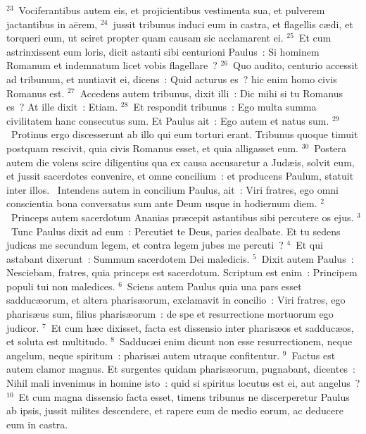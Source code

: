 ${}^{23}$~Vociferantibus autem eis, et projicientibus vestimenta sua, et pulverem jactantibus in a\"erem,
${}^{24}$~jussit tribunus induci eum in castra, et flagellis c\ae di, et torqueri eum, ut sciret propter quam causam sic acclamarent ei.
${}^{25}$~Et cum astrinxissent eum loris, dicit astanti sibi centurioni Paulus~: Si hominem Romanum et indemnatum licet vobis flagellare~?
${}^{26}$~Quo audito, centurio accessit ad tribunum, et nuntiavit ei, dicens~: Quid acturus es~? hic enim homo civis Romanus est.
${}^{27}$~Accedens autem tribunus, dixit illi~: Dic mihi si tu Romanus es~? At ille dixit~: Etiam.
${}^{28}$~Et respondit tribunus~: Ego multa summa civilitatem hanc consecutus sum. Et Paulus ait~: Ego autem et natus sum.
${}^{29}$~Protinus ergo discesserunt ab illo qui eum torturi erant. Tribunus quoque timuit postquam rescivit, quia civis Romanus esset, et quia alligasset eum.
${}^{30}$~Postera autem die volens scire diligentius qua ex causa accusaretur a Jud\ae is, solvit eum, et jussit sacerdotes convenire, et omne concilium~: et producens Paulum, statuit inter illos.
~Intendens autem in concilium Paulus, ait~: Viri fratres, ego omni conscientia bona conversatus sum ante Deum usque in hodiernum diem.
${}^{2}$~Princeps autem sacerdotum Ananias pr\ae cepit astantibus sibi percutere os ejus.
${}^{3}$~Tunc Paulus dixit ad eum~: Percutiet te Deus, paries dealbate. Et tu sedens judicas me secundum legem, et contra legem jubes me percuti~?
${}^{4}$~Et qui astabant dixerunt~: Summum sacerdotem Dei maledicis.
${}^{5}$~Dixit autem Paulus~: Nesciebam, fratres, quia princeps est sacerdotum. Scriptum est enim~: Principem populi tui non maledices.
${}^{6}$~Sciens autem Paulus quia una pars esset sadduc\ae orum, et altera pharis\ae orum, exclamavit in concilio~: Viri fratres, ego pharis\ae us sum, filius pharis\ae orum~: de spe et resurrectione mortuorum ego judicor.
${}^{7}$~Et cum h\ae c dixisset, facta est dissensio inter pharis\ae os et sadduc\ae os, et soluta est multitudo.
${}^{8}$~Sadduc\ae i enim dicunt non esse resurrectionem, neque angelum, neque spiritum~: pharis\ae i autem utraque confitentur.
${}^{9}$~Factus est autem clamor magnus. Et surgentes quidam pharis\ae orum, pugnabant, dicentes~: Nihil mali invenimus in homine isto~: quid si spiritus locutus est ei, aut angelus~?
${}^{10}$~Et cum magna dissensio facta esset, timens tribunus ne discerperetur Paulus ab ipsis, jussit milites descendere, et rapere eum de medio eorum, ac deducere eum in castra.


